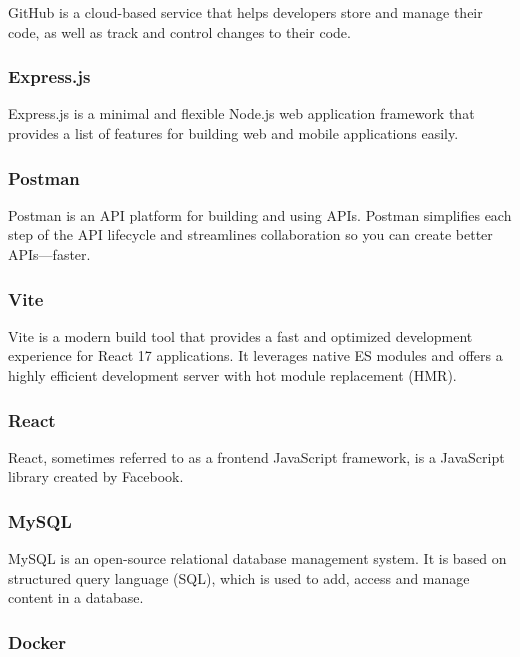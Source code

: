 GitHub is a cloud-based service that helps developers store and manage their code, as well as track and control changes to their code.

\subsubsection*{\protect{} Express.js}

Express.js is a minimal and flexible Node.js web application framework that provides a list of features for building web and mobile applications easily.

\subsubsection*{\protect{} Postman}

Postman is an API platform for building and using APIs. Postman simplifies each step of the API lifecycle and streamlines collaboration so you can create better APIs—faster.

\subsubsection*{\protect{} Vite}

Vite is a modern build tool that provides a fast and optimized development experience for React 17 applications. It leverages native ES modules and offers a highly efficient development server with hot module replacement (HMR).

\subsubsection*{\protect{} React}

React, sometimes referred to as a frontend JavaScript framework, is a JavaScript library created by Facebook.

\subsubsection*{\protect{} MySQL}

MySQL is an open-source relational database management system. It is based on structured query language (SQL), which is used to add, access and manage content in a database.

\subsubsection*{\protect{} Docker}

